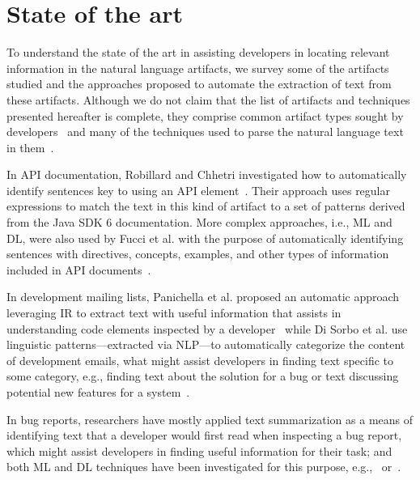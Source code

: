 \section{State of the art}
\label{cp1:novelty}



To understand the state of the art
in assisting developers in locating relevant information in the natural language artifacts, 
we survey some of the artifacts studied and 
the approaches proposed to
automate the extraction of text from these artifacts.
Although we do not claim that the list of artifacts and techniques presented hereafter is complete,
they comprise common artifact types sought by developers~\cite{umarji2008archetypal, Li2013}
and many of the techniques used to parse the natural language text in them~\cite{arnaoudova2015}.







In API documentation, Robillard and Chhetri investigated how to automatically identify 
sentences key to using an API element~\cite{Robillard2015}.
Their approach uses regular expressions to match the text in this kind of artifact 
to a set of patterns derived from the Java SDK 6 documentation.
More complex approaches, i.e.,  \acf{ML} and \acf{DL},
were also used by Fucci et al.
with the purpose of automatically identifying sentences with 
directives, concepts, examples, and other types of information included in API documents~\cite{fucci2019}.



In development mailing lists, Panichella et al. 
proposed an automatic approach leveraging \acf{IR} to extract 
text with useful information that assists in understanding code elements inspected by a developer~\cite{panichella2012}
while Di Sorbo et al. use linguistic patterns---extracted via \acf{NLP}---to
automatically categorize the content of development emails, what might 
assist developers in finding text specific to some category, e.g., 
finding text about the solution for a bug or text discussing potential 
new features for a system~\cite{Sorbo2015}.



In bug reports, researchers have mostly applied text summarization
as a means of identifying text that a developer would first read when inspecting a bug report, 
which might assist developers in finding useful information for their task;
and both \acs{ML} and 
\acs{DL} techniques have been investigated for this purpose, 
e.g.,~\cite{Lotufo2012} or~\cite{li2018deep}.



